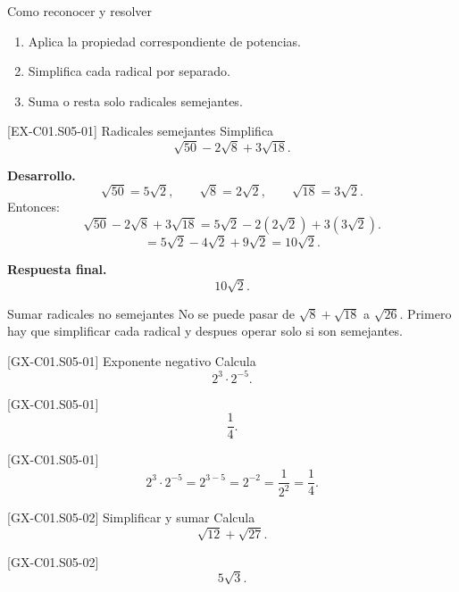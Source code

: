 \begin{methodbox}{Como reconocer y resolver}
\begin{enumerate}
  \item Aplica la propiedad correspondiente de potencias.
  \item Simplifica cada radical por separado.
  \item Suma o resta solo radicales semejantes.
\end{enumerate}
\end{methodbox}

\begin{solvedexample}{[EX-C01.S05-01] Radicales semejantes}
Simplifica
\[
\sqrt{50}-2\sqrt{8}+3\sqrt{18}.
\]

\textbf{Desarrollo.}
\[
\sqrt{50}=5\sqrt{2},\qquad \sqrt{8}=2\sqrt{2},\qquad \sqrt{18}=3\sqrt{2}.
\]
Entonces:
\[
\sqrt{50}-2\sqrt{8}+3\sqrt{18}=5\sqrt{2}-2(2\sqrt{2})+3(3\sqrt{2}).
\]
\[
=5\sqrt{2}-4\sqrt{2}+9\sqrt{2}=10\sqrt{2}.
\]

\textbf{Respuesta final.}
\[
\boxed{10\sqrt{2}}.
\]
\end{solvedexample}

\begin{commonerror}{Sumar radicales no semejantes}
No se puede pasar de \(\sqrt{8}+\sqrt{18}\) a \(\sqrt{26}\). Primero hay que simplificar cada
radical y despues operar solo si son semejantes.
\end{commonerror}

\begin{guidedexercise}{[GX-C01.S05-01] Exponente negativo}
Calcula
\[
2^3\cdot 2^{-5}.
\]
\end{guidedexercise}

\begin{shortanswer}{[GX-C01.S05-01]}
\[
\frac{1}{4}.
\]
\end{shortanswer}

\begin{fullsolution}{[GX-C01.S05-01]}
\[
2^3\cdot 2^{-5}=2^{3-5}=2^{-2}=\frac{1}{2^2}=\frac{1}{4}.
\]
\end{fullsolution}

\begin{guidedexercise}{[GX-C01.S05-02] Simplificar y sumar}
Calcula
\[
\sqrt{12}+\sqrt{27}.
\]
\end{guidedexercise}

\begin{shortanswer}{[GX-C01.S05-02]}
\[
5\sqrt{3}.
\]
\end{shortanswer}

